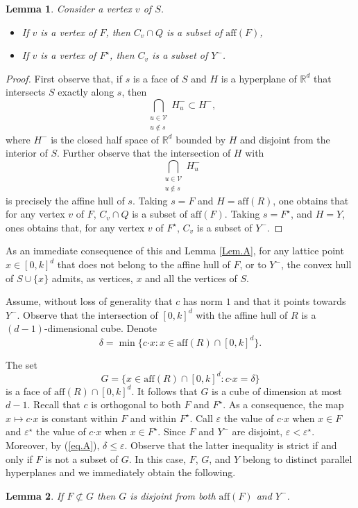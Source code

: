 \documentclass[a4paper]{article}
\newtheorem{lemma}{Lemma}
\renewcommand{\S}{\mathcal{S}}
\begin{document}
\begin{lemma}\label{Lem.B}
Consider a vertex $v$ of $S$.
\begin{itemize}
\item[i.] If $v$ is a vertex of $F$, then $C_v\cap{Q}$ is a subset of $\mathrm{aff}(F)$,
\item[ii.] If $v$ is a vertex of $F^\star$, then $C_v$ is a subset of $Y^-$.
\end{itemize}
\end{lemma}

\begin{proof}
First observe that, if $s$ is a face of $S$ and $H$ is a hyperplane of $\mathbb{R}^d$ that intersects $S$ exactly along $s$, then
$$
\bigcap_{\substack{u\in\mathcal{V}\\u\not\in{s}}}H_u^-\subset{H^-}\mbox{,}
$$
where $H^-$ is the closed half space of $\mathbb{R}^d$ bounded by $H$ and disjoint from the interior of $S$. Further observe that the intersection of $H$ with
$$
\bigcap_{\substack{u\in\mathcal{V}\\u\not\in{s}}}H_u^-
$$
is precisely the affine hull of $s$. Taking $s=F$ and $H=\mathrm{aff}(R)$, one obtains that for any vertex $v$ of $F$, $C_v\cap{Q}$ is a subset of $\mathrm{aff}(F)$. Taking $s=F^\star$, and $H=Y$, ones obtains that, for any vertex $v$ of $F^\star$, $C_v$ is a subset of $Y^-$.%
\end{proof}

As an immediate consequence of this and Lemma \ref{Lem.A}, for any lattice point $x\in[0,k]^d$ that does not belong to the affine hull of $F$, or to $Y^-$, the convex hull of $S\cup\{x\}$ admits, as vertices, $x$ and all the vertices of $S$.

Assume, without loss of generality that $c$ has norm $1$ and that it points towards $Y^-$. Observe that the intersection of $[0,k]^d$ with the affine hull of $R$ is a $(d-1)$-dimensional cube. Denote
\begin{equation}\label{eq.A}
\delta=\min\{c\mathord{\cdot}x:x\in\mathrm{aff}(R)\cap[0,k]^d\}\mbox{.}
\end{equation}

The set
$$
G=\{x\in\mathrm{aff}(R)\cap[0,k]^d:c\mathord{\cdot}x=\delta\}
$$
is a face of $\mathrm{aff}(R)\cap[0,k]^d$. It follows that $G$ is a cube of dimension at most $d-1$. Recall that $c$ is orthogonal to both $F$ and $F^\star$. As a consequence, the map $x\mapsto{c\mathord{\cdot}x}$ is constant within $F$ and within $F^\star$. Call $\varepsilon$ the value of $c\mathord{\cdot}x$ when $x\in{F}$ and $\varepsilon^\star$ the value of $c\mathord{\cdot}x$ when $x\in{F^\star}$. Since $F$ and $Y^-$ are disjoint, $\varepsilon<\varepsilon^\star$. Moreover, by (\ref{eq.A}), $\delta\leq\varepsilon$. Observe that the latter inequality is strict if and only if $F$ is not a subset of $G$. In this case, $F$, $G$, and $Y$ belong to distinct parallel hyperplanes and we immediately obtain the following.
\begin{lemma}\label{Lem.BC}
If $F\not\subset{G}$ then $G$ is disjoint from both $\mathrm{aff}(F)$ and $Y^-$.
\end{lemma}
\end{document}
